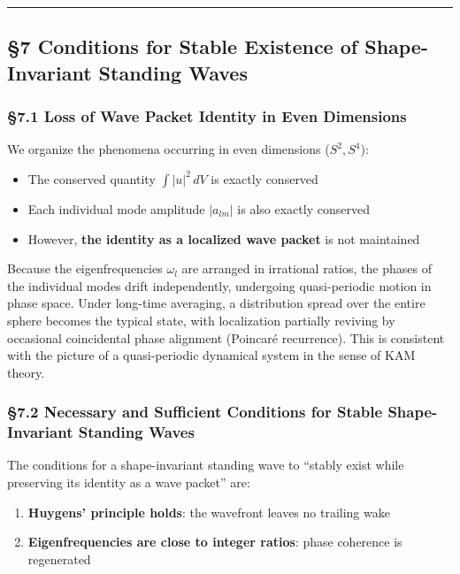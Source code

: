 \documentclass[
  a4paper,11pt]{article}
\providecommand{\tightlist}{%
  \setlength{\itemsep}{0pt}\setlength{\parskip}{0pt}}
\theoremstyle{definition}
\theoremstyle{remark}
\begin{document}
\begin{center}\rule{0.5\linewidth}{0.5pt}\end{center}

\subsection{§7 Conditions for Stable Existence of Shape-Invariant
Standing
Waves}\label{conditions-for-stable-existence-of-shape-invariant-standing-waves}

\subsubsection{§7.1 Loss of Wave Packet Identity in Even
Dimensions}\label{loss-of-wave-packet-identity-in-even-dimensions}

We organize the phenomena occurring in even dimensions (\(S^2, S^4\)):

\begin{itemize}
\tightlist
\item
  The conserved quantity \(\int |u|^2 \, dV\) is exactly conserved
\item
  Each individual mode amplitude \(|a_{lm}|\) is also exactly conserved
\item
  However, \textbf{the identity as a localized wave packet} is not
  maintained
\end{itemize}

Because the eigenfrequencies \(\omega_l\) are arranged in irrational
ratios, the phases of the individual modes drift independently,
undergoing quasi-periodic motion in phase space. Under long-time
averaging, a distribution spread over the entire sphere becomes the
typical state, with localization partially reviving by occasional
coincidental phase alignment (Poincaré recurrence). This is consistent
with the picture of a quasi-periodic dynamical system in the sense of
KAM theory.

\subsubsection{§7.2 Necessary and Sufficient Conditions for Stable
Shape-Invariant Standing
Waves}\label{necessary-and-sufficient-conditions-for-stable-shape-invariant-standing-waves}

The conditions for a shape-invariant standing wave to ``stably exist
while preserving its identity as a wave packet'' are:

\begin{enumerate}
\def\labelenumi{\arabic{enumi}.}
\tightlist
\item
  \textbf{Huygens' principle holds}: the wavefront leaves no trailing
  wake
\item
  \textbf{Eigenfrequencies are close to integer ratios}: phase coherence
  is regenerated
\end{enumerate}
\end{document}
